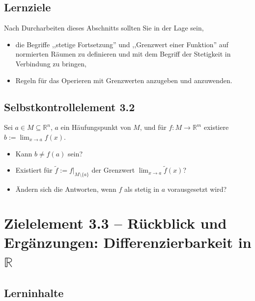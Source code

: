 \documentclass[a4paper,12pt]{article}
\begin{document}
\subsection*{Lernziele}

Nach Durcharbeiten dieses Abschnitts sollten Sie in der Lage sein,
\begin{itemize}
  \item die Begriffe ,,stetige Fortsetzung'' und ,,Grenzwert einer Funktion''
        auf normierten R\"aumen zu definieren und mit dem Begriff der
        Stetigkeit in Verbindung zu bringen,
  \item Regeln f\"ur das Operieren mit Grenzwerten anzugeben und anzuwenden.
\end{itemize}

\subsection*{Selbstkontrollelement 3.2}

Sei $a \in M \subseteq \mathbb{R}^n$, $a$ ein H\"aufungspunkt von $M$, und
f\"ur $f : M \to \mathbb{R}^m$ existiere $b := \lim_{x \to a} f(x)$.
\begin{itemize}
  \item Kann $b \neq f(a)$ sein?
  \item Existiert f\"ur $\tilde{f} := f|_{M \setminus \{a\}}$ der Grenzwert
        $\lim_{x \to a} \tilde{f}(x)$?
  \item \"Andern sich die Antworten, wenn $f$ als stetig in $a$ vorausgesetzt wird?
\end{itemize}

\newpage

\section*{Zielelement 3.3 -- R\"uckblick und Erg\"anzungen: Differenzierbarkeit in $\mathbb{R}$}

\subsection*{Lerninhalte}
\end{document}
